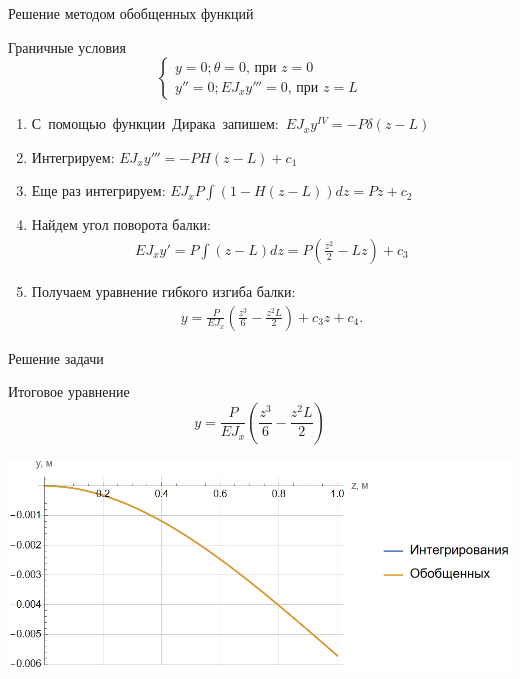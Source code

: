 \documentclass[ignoreonframetext,unicode]{beamer}
\begin{document}
	\begin{frame}{Решение методом обобщенных функций}
	
	\begin{block}{Граничные условия}\vspace*{-1.0mm}
	\[
	\begin{cases}
		y = 0; \theta = 0\mbox{, при } z = 0\\
		y'' = 0; E J_{x} y''' = 0\mbox{, при } z = L
	\end{cases}
	\]		
	\end{block}
	
	\begin{enumerate}
		\item С~помощью~функции~Дирака~запишем:~$E J_{x} y^{IV} = -P \delta (z - L)$
		
		\item Интегрируем:
		$
			E J_{x} y''' = -P H (z - L) + c_1
		$
		
		\item Еще раз интегрируем:
		$
			E J_{x}P \int  (1 - H (z - L)) dz = Pz + c_2
		$
		
		\item Найдем угол поворота балки:
		\begin{gather*}
			E J_{x} y' = P \int (z - L) dz = P \left(\frac{z^2}{2} - L z\right) + c_3
		\end{gather*}
	
	\item Получаем уравнение гибкого изгиба балки:
	\begin{gather*}
		y = \frac{P}{E J_{x}} \left(\frac{z^3}{6} - \frac{z^2 L}{2}\right) + c_3 z + c_4.
	\end{gather*}
		
	\end{enumerate}
\end{frame}

\begin{frame}{Решение задачи}
	\begin{block}{Итоговое уравнение}	
		\[
		y = \frac{P}{E J_{x}} \left(\frac{z^3}{6} - \frac{z^2  L}{2}\right)
		\]
	\end{block}

		\includegraphics[width=1\textwidth]{g.1}

\end{frame}
\end{document}
